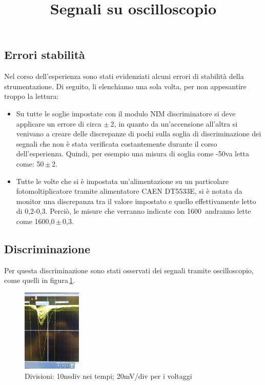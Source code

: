 \documentclass[a4paper,twocolumn]{article}
\begin{document}
\subsection*{Errori stabilità}
\label{sec:ErrSis}
Nel corso dell'esperienza sono stati evidenziati alcuni errori di stabilità della strumentazione.
Di seguito, li elenchiamo una sola volta, per non appesantire troppo la lettura:
\begin{itemize}
\item Su tutte le soglie impostate con il modulo NIM discriminatore si deve applicare un errore di circa $\pm$\,2\:\milli\volt\;, in quanto da un'accensione all'altra si venivano a creare delle discrepanze di pochi \milli\volt\;sulla soglia di discriminazione dei segnali che non è stata verificata costantemente durante il corso dell'esperienza. Quindi, per esempio una misura di soglia come -50\:\milli\volt\;va letta come: 50\,$\pm$\,2\:\milli\volt.
\item Tutte le volte che si è impostata un'alimentazione su un particolare fotomoltiplicatore tramite alimentatore CAEN DT5533E, si è notata da monitor una discrepanza tra il valore impostato e quello effettivamente letto di 0,2-0,3\:\volt. Perciò, le misure che verranno indicate con 1600\,\volt\; andranno lette come 1600,0\,$\pm\,$0,3\:\volt.
\end{itemize}

\subsection{Discriminazione}
\label{sec:DiscrSegn}
Per questa discriminazione sono stati osservati dei segnali tramite oscilloscopio, come quelli in figura\,\ref{fig:SegnaliOsc}.

\begin{figure}[ht]
\centering
\title{Segnali su oscilloscopio}
\begin{center}
\includegraphics[width=0.25\textwidth]{./immagini/TimeOfFlight/SegnaliOsc.jpg}
\caption{Divisioni: 10\:ns\per div nei tempi; 20\:mV/div per i voltaggi}
\label{fig:SegnaliOsc}
\end{center}
\end{figure}
\end{document}
